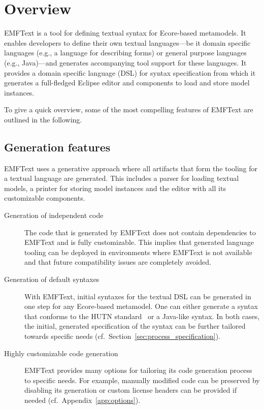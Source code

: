 \chapter{Overview}
EMFText is a tool for defining textual syntax for Ecore-based metamodels. It 
enables developers to define their own textual languages---be it domain
specific languages (e.g., a language for describing forms) or general purpose 
languages (e.g., Java)---and generates accompanying tool support for these 
languages. It provides a domain specific language (DSL) for syntax 
specification from which it generates a full-fledged Eclipse editor and 
components to load and store model instances.

To give a quick overview, some of the most compelling features of EMFText are 
outlined in the following.

\section{Generation features}
EMFText uses a generative approach where all artifacts that form the tooling for
a textual language are generated. This includes a parser for loading textual 
models, a printer for storing model instances and the editor with all its
customizable components.

\begin{description}

  \item[Generation of independent code]
        The code that is generated by EMFText does not contain dependencies
        to EMFText and is fully customizable. This implies that generated 
        language tooling can be deployed in environments where EMFText is not 
        available and that future compatibility issues are completely avoided.

  \item[Generation of default syntaxes]
        With EMFText, initial syntaxes for the textual DSL can be generated 
        in one step for any Ecore-based metamodel. One can either generate a
        syntax that conforms to the HUTN standard~\cite{HUTN} or a Java-like 
        syntax. In both cases, the initial, generated specification of the 
        syntax can be further tailored towards specific needs 
        (cf.~Section~\ref{sec:process_specification}).
        
  \item[Highly customizable code generation]
        EMFText provides many options for tailoring its code generation process
        to specific needs. For example, manually modified code can be preserved
        by disabling its generation or custom license headers can be provided 
        if needed (cf.~Appendix~\ref{app:options}\label{app:options}).

\end{description}


